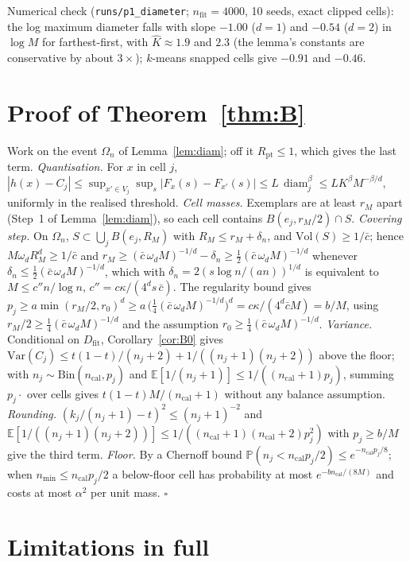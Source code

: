 \documentclass[11pt]{article}
\theoremstyle{definition}
\theoremstyle{remark}
\newcommand{\Dfit}{D_{\mathrm{fit}}}
\newcommand{\E}{\mathbb{E}}
\renewcommand{\P}{\mathbb{P}}
\newcommand{\1}{\mathbf{1}}
\DeclareMathOperator{\diam}{diam}
\begin{document}
Numerical check (\texttt{runs/p1\_diameter}; $n_{\mathrm{fit}}=4000$, 10 seeds, exact clipped
cells): the log maximum diameter falls with slope $-1.00$ ($d=1$) and $-0.54$ ($d=2$) in $\log M$
for farthest-first, with $\hat K\approx1.9$ and $2.3$ (the lemma's constants are conservative by
about $3\times$); $k$-means snapped cells give $-0.91$ and $-0.46$.

\section{Proof of Theorem~\ref{thm:B}}
\label{app:thmB}
Work on the event $\Omega_n$ of Lemma~\ref{lem:diam}; off it $R_{\mathrm{pt}}\le1$, which gives the last
term. \emph{Quantisation.} For $x$ in cell $j$, $|h(x)-C_j|\le\sup_{x'\in V_j}\sup_s|F_x(s)-F_{x'}(s)|\le
L\,\diam_j^{\beta}\le L K^{\beta}M^{-\beta/d}$, uniformly in the realised threshold. \emph{Cell masses.}
Exemplars are at least $r_M$ apart (Step~1 of Lemma~\ref{lem:diam}), so each cell contains
$B(e_j,r_M/2)\cap S$. \emph{Covering step.} On $\Omega_n$, $S\subset\bigcup_j B(e_j,R_M)$ with
$R_M\le r_M+\delta_n$, and $\mathrm{Vol}(S)\ge1/\bar c$; hence $M\omega_d R_M^d\ge1/\bar c$ and
$r_M\ge(\bar c\,\omega_d M)^{-1/d}-\delta_n\ge\tfrac12(\bar c\,\omega_d M)^{-1/d}$ whenever
$\delta_n\le\tfrac12(\bar c\,\omega_d M)^{-1/d}$, which with $\delta_n=2(s\log n/(an))^{1/d}$ is
equivalent to $M\le c''n/\log n$, $c''=c\kappa/(4^d s\,\bar c)$. The regularity bound gives
$p_j\ge a\min(r_M/2,r_0)^d\ge a\,\big(\tfrac14(\bar c\,\omega_dM)^{-1/d}\big)^d=c\kappa/(4^d\bar c M)=b/M$,
using $r_M/2\ge\tfrac14(\bar c\,\omega_dM)^{-1/d}$ and the assumption $r_0\ge\tfrac14(\bar c\,\omega_dM)^{-1/d}$. \emph{Variance.} Conditional on $\Dfit$, Corollary~\ref{cor:B0} gives
$\mathrm{Var}(C_j)\le t(1-t)/(n_j+2)+1/((n_j+1)(n_j+2))$ above the floor; with
$n_j\sim\mathrm{Bin}(n_{\mathrm{cal}},p_j)$ and $\E[1/(n_j+1)]\le1/((n_{\mathrm{cal}}+1)p_j)$, summing
$p_j\cdot$ over cells gives $t(1-t)M/(n_{\mathrm{cal}}+1)$ without any balance assumption.
\emph{Rounding.} $(k_j/(n_j+1)-t)^2\le(n_j+1)^{-2}$ and
$\E[1/((n_j+1)(n_j+2))]\le1/((n_{\mathrm{cal}}+1)(n_{\mathrm{cal}}+2)p_j^2)$ with $p_j\ge b/M$ give the
third term. \emph{Floor.} By a Chernoff bound $\P(n_j<n_{\mathrm{cal}}p_j/2)\le e^{-n_{\mathrm{cal}}p_j/8}$;
when $n_{\min}\le n_{\mathrm{cal}}p_j/2$ a below-floor cell has probability at most
$e^{-b n_{\mathrm{cal}}/(8M)}$ and costs at most $\alpha^2$ per unit mass. \hfill$\square$

\section{Limitations in full}
\label{app:limitations}
\end{document}
